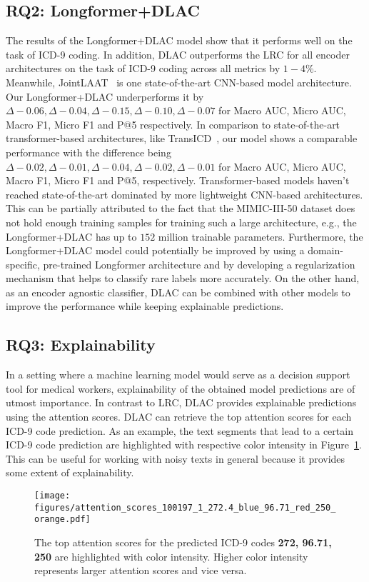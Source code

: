\documentclass[11pt]{article}
\begin{document}
\subsection{RQ2: Longformer+DLAC}
The results of the Longformer+DLAC model show that it performs well on the task of ICD-9 coding. In addition, DLAC outperforms the LRC for all encoder architectures on the task of ICD-9 coding across all metrics by $1-4\%$. 
Meanwhile, JointLAAT~\citep{Vu} is one state-of-the-art CNN-based model architecture. Our Longformer+DLAC underperforms it by $\Delta-0.06, \Delta-0.04, \Delta-0.15, \Delta-0.10, \Delta-0.07$ for Macro AUC, Micro AUC, Macro F1, Micro F1 and P@5 respectively. 
In comparison to state-of-the-art transformer-based architectures, like TransICD~\citep{biswas2021transicd}, our model shows a comparable performance with the difference being $\Delta-0.02, \Delta-0.01, \Delta-0.04, \Delta-0.02, \Delta-0.01$ for Macro AUC, Micro AUC, Macro F1, Micro F1 and P@5, respectively. Transformer-based models haven't reached state-of-the-art dominated by more lightweight CNN-based architectures. This can be partially attributed to the fact that the MIMIC-III-50 dataset does not hold enough training samples for training such a large architecture, e.g., the Longformer+DLAC has up to $152$ million trainable parameters. Furthermore, the Longformer+DLAC model could potentially be improved by using a domain-specific, pre-trained Longformer architecture \citep{PubMedBERT} and by developing a regularization mechanism \citep{cao2019learning} that helps to classify rare labels more accurately. On the other hand, as an encoder agnostic classifier, DLAC can be combined with other models to improve the performance while keeping explainable predictions. 

\subsection{RQ3: Explainability}
In a setting where a machine learning model would serve as a decision support tool for medical workers, explainability of the obtained model predictions are of utmost importance. In contrast to LRC, DLAC provides explainable predictions using the attention scores. DLAC can retrieve the top attention scores for each ICD-9 code prediction. As an example, the text segments that lead to a certain ICD-9 code prediction are highlighted with respective color intensity in Figure~\ref{fig:attention_scores_marker}.
This can be useful for working with noisy texts in general because it provides some extent of explainability.
\begin{figure}[t]
\centering
\texttt{[image: figures/attention\_scores\_100197\_1\_272.4\_blue\_96.71\_red\_250\_orange.pdf]}
\caption{The top attention scores for the predicted ICD-9 codes \textbf{272, 96.71, 250} are highlighted with color intensity. Higher color intensity represents larger attention scores and vice versa.}
\label{fig:attention_scores_marker}
\end{figure}
\end{document}
